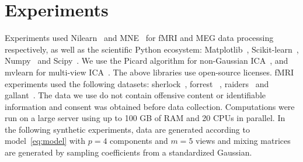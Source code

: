 \documentclass{report}
\begin{document}

\section{Experiments}
Experiments used Nilearn~\cite{abraham2014machine} and MNE~\cite{gramfort2013meg} for fMRI and MEG data
processing respectively, as well as the scientific Python ecosystem:
Matplotlib~\cite{hunter2007matplotlib}, Scikit-learn~\cite{pedregosa2011scikit},
Numpy~\cite{harris2020array} and Scipy~\cite{2020SciPy-NMeth}. We use the Picard algorithm for non-Gaussian ICA~\cite{ablin2018faster}, and mvlearn for multi-view ICA~\cite{perry2020mvlearn}. The above libraries use open-source licenses. fMRI experiments used the following datasets: sherlock~\cite{chen2017shared}, forrest~\cite{hanke2014high} , raiders~\cite{ibc} and gallant~\cite{ibc}. The data we use do not contain offensive content or identifiable information and consent was obtained before data collection. Computations were run on a large server using up to 100 GB of RAM and 20 CPUs in parallel.
%
In the following synthetic experiments, data are generated according to model~\eqref{eq:model} with $p=4$ components and $m=5$ views and mixing matrices are generated by sampling coefficients from a standardized Gaussian.
\end{document}
